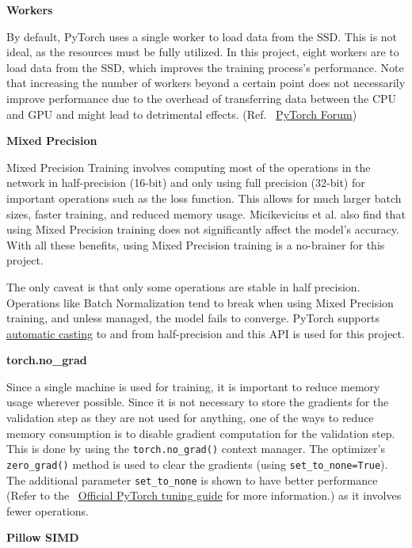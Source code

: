 \documentclass[a4paper,11pt,openright]{book}
\begin{document}
\textbf{Workers}

By default, PyTorch uses a single worker to load data from the SSD. This is not ideal, as the resources must be fully utilized. In this project, eight workers are to load data from the SSD, which improves the training process's performance. Note that increasing the number of workers beyond a certain point does not necessarily improve performance due to the overhead of transferring data between the CPU and GPU and might lead to detrimental effects. (Ref. ~\href{https://discuss.pytorch.org/t/guidelines-for-assigning-num-workers-to-dataloader/813}{PyTorch Forum})

\textbf{Mixed Precision}

Mixed Precision Training \cite{micikeviciusMixedPrecisionTraining2017} involves computing most of the operations in the network in half-precision (16-bit) and only using full precision (32-bit) for important operations such as the loss function. This allows for much larger batch sizes, faster training, and reduced memory usage. Micikevicius et al. also find that using Mixed Precision training does not significantly affect the model's accuracy. With all these benefits, using Mixed Precision training is a no-brainer for this project.

The only caveat is that only some operations are stable in half precision. Operations like Batch Normalization tend to break when using Mixed Precision training, and unless managed, the model fails to converge. PyTorch supports \href{https://pytorch.org/docs/stable/notes/amp_examples.html}{automatic casting} to and from half-precision and this API is used for this project.

\textbf{torch.no\_grad}

Since a single machine is used for training, it is important to reduce memory usage wherever possible. Since it is not necessary to store the gradients for the validation step as they are not used for anything, one of the ways to reduce memory consumption is to disable gradient computation for the validation step. This is done by using the \texttt{torch.no\_grad()} context manager.  The optimizer's \texttt{zero\_grad()} method is used to clear the gradients (using \texttt{set\_to\_none=True}). The additional parameter \texttt{set\_to\_none} is shown to have better performance (Refer to the ~\href{https://pytorch.org/tutorials/recipes/recipes/tuning_guide.html}{Official PyTorch tuning guide} for more information.) as it involves fewer operations.

\textbf{Pillow SIMD}
\end{document}
